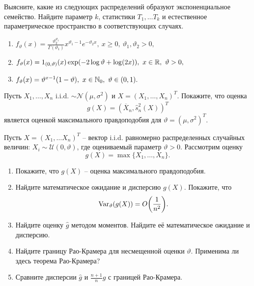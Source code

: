 \begin{exc}
	Выясните, какие из следующих распределений образуют экспоненциальное семейство. Найдите параметр $k$, статистики $T_1, \dots T_k$ и естественное параметрическое пространство в соответствующих случаях.
	\begin{enumerate}
	    \item $ f_\vartheta(x) = \frac{\vartheta_2^{\vartheta_1}}{\Gamma(\vartheta_1)}x^{\vartheta_1-1}e^{-\vartheta_2x}, \ x \geq 0,\ \vartheta_1, \vartheta_2 > 0, $
	    \item $ f_\vartheta(x) = 1_{(0, \vartheta)}(x) \exp(-2 \log \vartheta + \log(2x)), \ x \in \mathbb{R},\ \vartheta > 0,  $
	    \item $ f_\vartheta(x) = \vartheta^{x-1}(1-\vartheta), \ x \in \mathbb{N}_0,\ \vartheta \in (0, 1).$ 
	\end{enumerate}
\end{exc}

\begin{exc}
	Пусть $X_1, \dots, X_n$ i.i.d. $\sim \mathcal{N}(\mu, \sigma^2)$ и $X = (X_1, \dots, X_n)^T$. Покажите, что оценка
	\[ g(X) = (\overline{X}_n, \hat{s}_n^2(X))^T  \]
	является оценкой максимального правдоподобия для $\vartheta = (\mu, \sigma^2)^T$.
\end{exc}

\begin{exc}
	Пусть $X = (X_1, \dots X_n)^T$ -- вектор i.i.d. равномерно распределенных случайных величин: $X_i \sim \mathcal{U}(0, \vartheta)$, где оцениваемый параметр $\vartheta > 0$. Рассмотрим оценку
	\[ g(X) = \max\{ X_1, \dots, X_n \}. \]
	\begin{enumerate}
		\item Покажите, что $g(X)$ -- оценка максимального правдоподобия.
		\item Найдите математическое ожидание и дисперсию $g(X)$. Покажите, что
		\[ \mathrm{Var}_\vartheta(g(X))=O \bigg(\frac{1}{n^2} \bigg). \]
		\item Найдите оценку $\hat{g}$ методом моментов. Найдите её математическое ожидание и дисперсию.
		\item Найдите границу Рао-Крамера для несмещенной оценки $\vartheta$. Применима ли здесь теорема Рао-Крамера?
		\item Сравните дисперсии $\hat{g}$ и $\frac{n+1}{n}g$ с границей Рао-Крамера.
	\end{enumerate}
\end{exc}